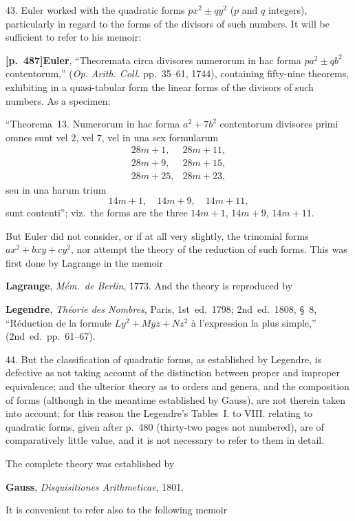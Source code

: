 \documentclass[11pt,a4paper]{article}
\begin{document}
43. Euler worked with the quadratic forms $px^{2} \pm qy^{2}$ ($p$ and $q$ integers), particularly in regard to the forms of the divisors of such numbers. It will be sufficient to refer to his memoir:

\noindent\textbf{[p.~487]}\quad \textbf{Euler}, ``Theoremata circa divisores numerorum in hac forma $pa^{2} \pm qb^{2}$ contentorum,'' (\textit{Op. Arith. Coll.} pp.~35--61, 1744), containing fifty-nine theorems, exhibiting in a quasi-tabular form the linear forms of the divisors of such numbers. As a specimen:

``Theorema~13. Numerorum in hac forma $a^{2} + 7b^{2}$ contentorum divisores primi omnes sunt vel $2$, vel $7$, vel in una sex formularum
\[
\begin{array}{ll}
28m + 1, & 28m + 11, \\
28m + 9, & 28m + 15, \\
28m + 25, & 28m + 23,
\end{array}
\]
seu in una harum trium
\[
14m + 1,\quad 14m + 9,\quad 14m + 11,
\]
sunt contenti''; viz.\ the forms are the three $14m + 1$, $14m + 9$, $14m + 11$.

But Euler did not consider, or if at all very slightly, the trinomial forms $ax^{2} + bxy + cy^{2}$, nor attempt the theory of the reduction of such forms. This was first done by Lagrange in the memoir

\textbf{Lagrange}, \textit{M\'em.\ de Berlin}, 1773. And the theory is reproduced by

\textbf{Legendre}, \textit{Th\'eorie des Nombres}, Paris, 1st~ed.\ 1798; 2nd~ed.\ 1808, \S~8, ``R\'eduction de la formule $Ly^{2} + Myz + Nz^{2}$ \`a l'expression la plus simple,'' (2nd~ed.\ pp.~61--67).

44. But the classification of quadratic forms, as established by Legendre, is defective as not taking account of the distinction between proper and improper equivalence; and the ulterior theory as to orders and genera, and the composition of forms (although in the meantime established by Gauss), are not therein taken into account; for this reason the Legendre's Tables~I. to VIII. relating to quadratic forms, given after p.~480 (thirty-two pages not numbered), are of comparatively little value, and it is not necessary to refer to them in detail.

The complete theory was established by

\textbf{Gauss}, \textit{Disquisitiones Arithmeticae}, 1801.

It is convenient to refer also to the following memoir
\end{document}
